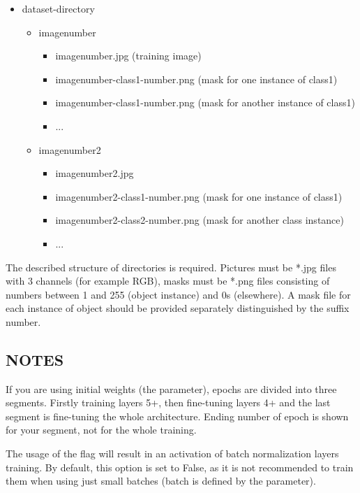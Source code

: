 \liststyleLi
\begin{itemize}
\item dataset-directory
\begin{itemize}
\item imagenumber 

\begin{itemize}
\item imagenumber.jpg (training image) 
\item imagenumber-class1-number.png (mask for one instance of class1) 
\item imagenumber-class1-number.png (mask for another instance of class1) 
\item ... 
\end{itemize}
\item imagenumber2 

\begin{itemize}
\item imagenumber2.jpg 
\item imagenumber2-class1-number.png (mask for one instance of class1) 
\item imagenumber2-class2-number.png (mask for another class instance) 
\item ... 
\end{itemize}
\end{itemize}
\end{itemize}

The described structure of directories is required. Pictures must be *.jpg files
with 3 channels (for example RGB), masks must be *.png files consisting of
numbers between 1 and 255 (object instance) and 0s (elsewhere). A mask file for
each instance of object should be provided separately distinguished by the
suffix number. 

\subsection*{NOTES}
If you are using initial weights (the  parameter),
epochs are divided into three segments. Firstly training layers 5+, then
fine-tuning layers 4+ and the last segment is fine-tuning the whole
architecture. Ending number of epoch is shown for your segment, not for the
whole training. 

The usage of the  flag will result in an activation of
batch normalization layers training. By default, this option is set to False,
as it is not recommended to train them when using just small batches (batch is
defined by the  parameter). 

